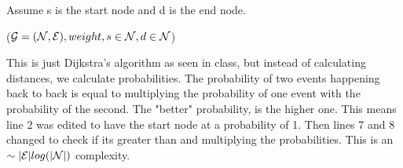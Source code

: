 Assume s is the start node and d is the end node.

\begin{myalgo}{($\mathcal{G} = (\mathcal{N}, \mathcal{E}), weight, s \in \mathcal{N}, d \in \mathcal{N}$)}
          \ENDIF
      \ENDFOR
  \ENDWHILE
\end{myalgo}

This is just Dijkstra's algorithm as seen in class, but instead of calculating distances, we calculate probabilities.
The probability of two events happening back to back is equal to multiplying the probability of one event with the probability of the second.
The "better" probability, is the higher one. This means line 2 was edited to have the start node at a probability of 1. Then lines 7 and 8 changed to check if its greater than and multiplying the probabilities.
This is an $\sim |\mathcal{E}| log(|\mathcal{N}|)$ complexity.

\SUBMITMSG{}
\DEFAULTGRADING{}

